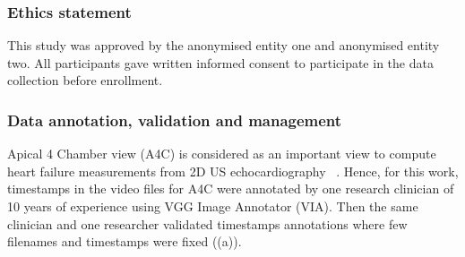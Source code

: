 \documentclass[mlabstract,twocolumn]{jmlr}
\begin{document}
\subsubsection{Ethics statement}
This study was approved by the anonymised entity one and anonymised entity two.
All participants gave written informed consent to participate in the data collection before enrollment.

\subsubsection{Data annotation, validation and management}
Apical 4 Chamber view (A4C) is considered as an important view to compute heart failure measurements from 2D US echocardiography ~\citep{2017_hall_JIntensiveCareSociety}.
Hence, for this work, timestamps in the video files for A4C were annotated by one research clinician of 10 years of experience using VGG Image Annotator (VIA).
Then the same clinician  and one researcher validated timestamps annotations where few filenames and timestamps were fixed ((a)).
\end{document}
